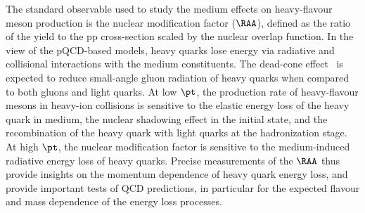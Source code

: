 


The standard observable used to study the medium effects on heavy-flavour meson production is the nuclear modification factor ($\RAA$), defined as the ratio of the \PbPb yield to the pp cross-section scaled by the nuclear overlap function. In the view of the pQCD-based models, heavy quarks lose energy via radiative and collisional interactions with the medium constituents. The dead-cone effect~\cite{DOKSHITZER2001199} is expected to reduce small-angle gluon radiation of heavy quarks when compared to both gluons and light quarks. At low $\pt$, the production rate of heavy-flavour mesons in heavy-ion collisions is sensitive to the elastic energy loss of the heavy quark in medium, the nuclear shadowing effect in the initial state, and the recombination of the heavy quark with light quarks at the hadronization stage. At high $\pt$, the nuclear modification factor is sensitive to the medium-induced radiative energy loss of heavy quarks. Precise measurements of the $\RAA$ thus provide insights on the momentum dependence of heavy quark energy loss, and provide important tests of QCD predictions, in particular for the expected flavour and mass dependence of the energy loss processes.

